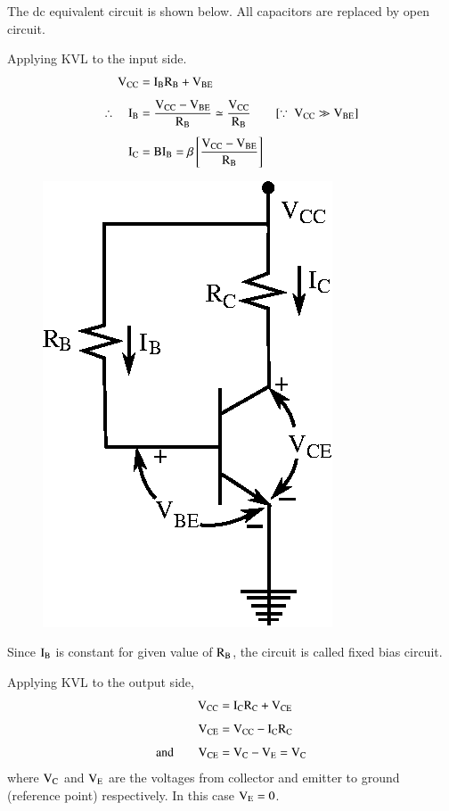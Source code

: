 The dc equivalent circuit is shown below. All capacitors are replaced by open circuit.


Applying KVL to the input side.
\begin{align*}
\rmV_{\text{CC}} &= \rmI_{\rmB}\rmR_{\rmB}+\rmV_{\text{BE}}\\[4pt]
\therefore\quad \rmI_{\rmB} &= \frac{\rmV_{\text{CC}}-\rmV_{\text{BE}}}{\rmR_{\rmB}}\simeq \dfrac{\rmV_{\text{CC}}}{\rmR_{\rmB}}\qquad [\because \ \rmV_{\text{CC}}\gg \rmV_{\text{BE}}]\\[4pt]
\rmI_{\rmC} &= \rmB\rmI_{\rmB} = \beta \left[\frac{\rmV_{\text{CC}}-\rmV_{\text{BE}}}{\rmR_{\rmB}}\right]
\end{align*}
\begin{figure}[H]
\centering
\includegraphics{chap3/fig3.4.eps}
\end{figure}


Since $\textrm{I}_{\textrm{B}}$ is constant for given value of $\textrm{R}_{\textrm{B}}$, the circuit is called fixed bias circuit.

Applying KVL to the output side,
\begin{align*}
\textrm{V}_{\text{CC}} &= \textrm{I}_{\textrm{C}}\textrm{R}_{\textrm{C}}+\textrm{V}_{\text{CE}}\\[4pt]
\textrm{V}_{\text{CE}} &= \textrm{V}_{\text{CC}}-\textrm{I}_{\textrm{C}}\textrm{R}_{\textrm{C}}\\[4pt]
\text{and}\qquad \textrm{V}_{\text{CE}} &= \textrm{V}_{\textrm{C}}-\textrm{V}_{\textrm{E}}=\textrm{V}_{\textrm{C}}
\end{align*}
where $\textrm{V}_{\textrm{C}}$ and $\textrm{V}_{\textrm{E}}$ are the voltages from collector and emitter to ground (reference point) respectively. In this case $\textrm{V}_{\textrm{E}}=0$.

